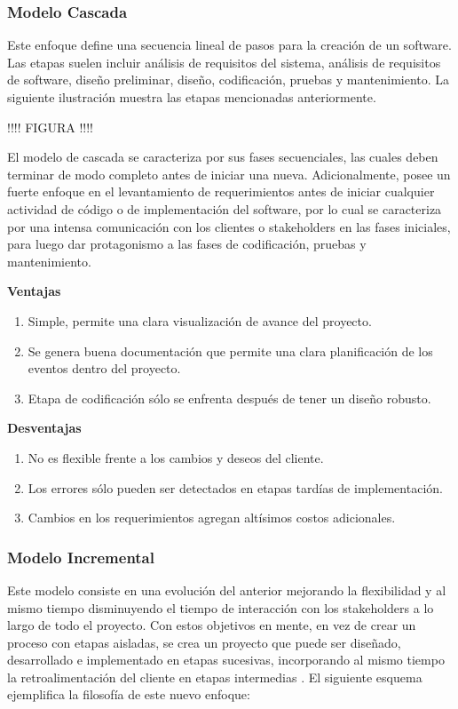 \subsubsection{Modelo Cascada \label{sec:cascade_model}}

Este enfoque define una secuencia lineal de pasos para la creación de un software. Las etapas suelen incluir análisis de requisitos del sistema, análisis de requisitos de software, diseño preliminar, diseño, codificación, pruebas y mantenimiento. La siguiente ilustración muestra las etapas mencionadas anteriormente.

!!!! FIGURA !!!!

El modelo de cascada se caracteriza por sus fases secuenciales, las cuales deben terminar de modo completo antes de iniciar una nueva. Adicionalmente, posee un fuerte enfoque en el levantamiento de requerimientos antes de iniciar cualquier actividad de código o de implementación del software, por lo cual se caracteriza por una intensa comunicación con los clientes o stakeholders en las fases iniciales, para luego dar protagonismo a las fases de codificación, pruebas y mantenimiento.

\textbf{Ventajas}
\begin{enumerate}
  \item Simple, permite una clara visualización de avance del proyecto.
  \item Se genera buena documentación que permite una clara planificación de los eventos dentro del proyecto.
  \item Etapa de codificación sólo se enfrenta después de tener un diseño robusto.
\end{enumerate}

\textbf{Desventajas}
\begin{enumerate}
  \item No es flexible frente a los cambios y deseos del cliente.
  \item Los errores sólo pueden ser detectados en etapas tardías de implementación.
  \item Cambios en los requerimientos agregan altísimos costos adicionales.
\end{enumerate}

\subsubsection{Modelo Incremental\label{sec:incremental_model}}

Este modelo consiste en una evolución del anterior mejorando la flexibilidad y al mismo tiempo disminuyendo  el tiempo de interacción con los stakeholders a lo largo de todo el proyecto. Con estos objetivos en mente, en vez de crear un proceso con etapas aisladas, se crea un proyecto que  puede ser diseñado, desarrollado e implementado en etapas sucesivas, incorporando al mismo tiempo la retroalimentación del cliente en etapas intermedias \cite{masssey}. El siguiente esquema ejemplifica la filosofía de este nuevo enfoque:

